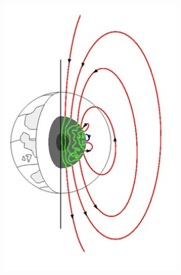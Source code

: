 \begin{figure}[ht]
	\centering

    \begin{subfigure}[t]{0.3\textwidth}
        \centering
        \includegraphics[width=.9\linewidth]{bilder/L3_earth_four_1.png}
        \caption{}\label{fig:L3_contributor1}
    \end{subfigure}
	\begin{subfigure}[t]{0.3\textwidth}
		\centering

\end{subfigure}
\end{figure}
